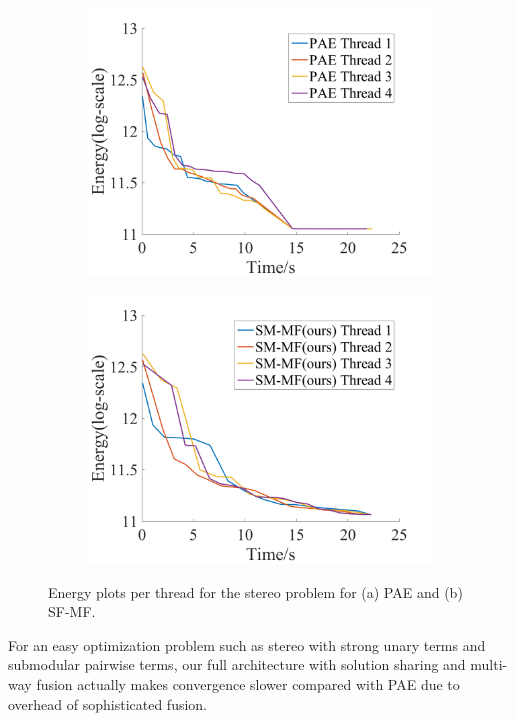 \begin{figure}[!h]
\centering
\begin{subfigure}{0.49\textwidth}
\includegraphics[width=\textwidth]{figure/stereo_thread_pae.png}
\caption{}
\end{subfigure}
\begin{subfigure}{0.49\textwidth}
\includegraphics[width=\textwidth]{figure/stereo_thread_sf.png}
\caption{}
\end{subfigure}
\caption{Energy plots per thread for the stereo problem for (a) PAE and (b)
SF-MF.}
\label{fig:stereo_threads}
\end{figure}

For an easy optimization problem such as stereo with strong unary
terms and submodular pairwise terms, our full architecture with
solution sharing and multi-way fusion actually makes convergence
slower compared with PAE due to overhead of sophisticated fusion.




